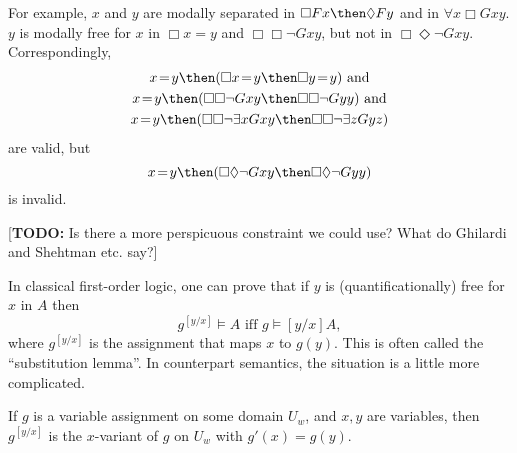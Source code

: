 \documentclass[11pt]{woarticle}
\newcommand{\cmnt}[1]{\iffalse #1 \fi}
\theoremstyle{break}
\theoremstyle{nonumberplain}
\newcommand{\1}{\;\,|\;\,}
\newcommand{\verum}{\top}
\newcommand{\falsum}{\bot}
\renewcommand{\t}[1]{\ensuremath{\langle #1  \makebox[.2ex]{}\rangle}}
\begin{document}
For example, $x$ and $y$ are modally separated in $\Box Fx \then \Diamond Fy$
and in $\forall x \Box Gxy$. $y$ is modally free for $x$ in $\Box x\!=\!y$ and
$\Box\Box \neg Gxy$, but not in $\Box\Diamond \neg Gxy$. Correspondingly,
\begin{gather*}
  x\!=\!y \then (\Box x\!=\!y \then \Box y\!=\!y) \text{ and}\\
  x\!=\!y \then (\Box\Box \neg Gxy \then \Box\Box \neg Gyy) \text{ and}\\
  x\!=\!y \then (\Box\Box \neg \exists x Gxy \then \Box\Box \neg \exists z Gyz)
\end{gather*}
are valid, but
\begin{equation*}
  x\!=\!y \then (\Box\Diamond \neg Gxy \then \Box\Diamond \neg Gyy)
\end{equation*}
is invalid.

\cmnt{%
  The first example is a tautological variant of Kutz's
  $x\!=\!y \then \Diamond x\!=\!x \then \Diamond x\!=\!y$.%
}

\cmnt{
  A natural first shot might be:
  \begin{quote}
    $x\!=\!y \then A \then [y/x]A$, provided $y$ and $x$ do not both
    occur in the scope of a diamond in $A$.
  \end{quote}
  But diamonds come in many disguises. E.g. $\Diamond \neg Fxy$ can
  also be expressed as $\neg(\verum \then \Box Gxy)$, or as $\Box Gxy
  \then \falsum$. (Our substitution system handles that correctly:
  $x\!=\!y \then (\Box Gxy \then \falsum) \Rightarrow \t{y:x}(\Box Gxy
  \then \falsum) \Rightarrow (\t{y:x}\Box Gxy \then \t{y:x}\falsum)
  \Rightarrow \neg \t{y:x}\Box Gxy \text{ [by propcal]} \Rightarrow
  \t{y:x}\neg\Box Gxy \Rightarrow \t{y:x}\Diamond \neg Gxy$.)
}

[\textbf{TODO:} Is there a more perspicuous constraint we could use? What do
Ghilardi and Shehtman etc. say?]


In classical first-order logic, one can prove that if $y$ is
(quantificationally) free for $x$ in $A$ then
\[
  g^{[y/x]} \models A \text{ iff } g \models [y/x]A,
\]
where $g^{[y/x]}$ is the assignment that maps $x$ to $g(y)$. This is often
called the ``substitution lemma''. In counterpart semantics, the situation is a
little more complicated.

\begin{definition}\label{!GSUB}
  If $g$ is a variable assignment on some domain $U_{w}$, and $x,y$ are
  variables, then $g^{[y/x]}$ is the $x$-variant of $g$ on $U_{w}$ with
  $g'(x) = g(y)$.
\end{definition}
\end{document}
